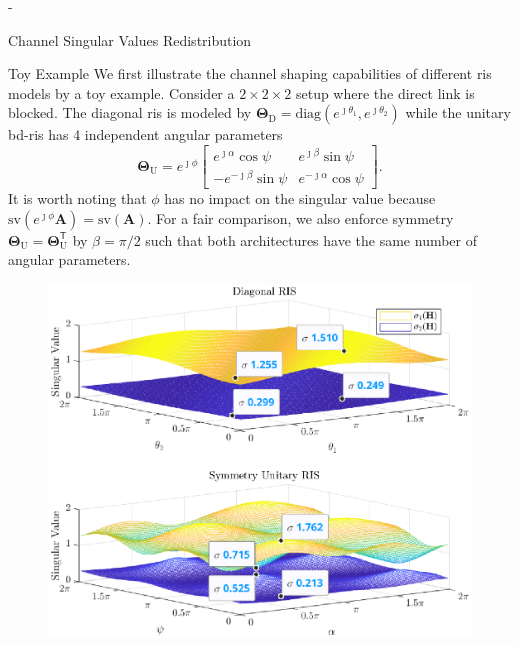 \begin{section}{-}
	\begin{subsection}{Channel Singular Values Redistribution}
		\begin{subsubsection}{Toy Example}\label{sc:toy_example}
			We first illustrate the channel shaping capabilities of different \gls{ris} models by a toy example.
			Consider a $2 \times 2 \times 2$ setup where the direct link is blocked.
			The diagonal \gls{ris} is modeled by $\mathbf{\Theta}_\mathrm{D} = \mathrm{diag}(e^{\jmath \theta_1}, e^{\jmath \theta_2})$ while the unitary \gls{bd}-\gls{ris} has 4 independent angular parameters
			\begin{equation}
				\mathbf{\Theta}_\mathrm{U} = e^{\jmath \phi} \begin{bmatrix}
					e^{\jmath \alpha} \cos \psi  & e^{\jmath \beta} \sin \psi   \\
					-e^{-\jmath \beta} \sin \psi & e^{-\jmath \alpha} \cos \psi
				\end{bmatrix}.
				\label{eq:unitary_ris}
			\end{equation}
			It is worth noting that $\phi$ has no impact on the singular value because $\mathrm{sv}(e^{\jmath \phi} \mathbf{A}) = \mathrm{sv}(\mathbf{A})$.
			For a fair comparison, we also enforce symmetry $\mathbf{\Theta}_\mathrm{U} = \mathbf{\Theta}_\mathrm{U}^\mathsf{T}$ by $\beta = \pi / 2$ such that both architectures have the same number of angular parameters.
			\begin{figure}
				\centering
				\includegraphics[width=\columnwidth]{assets/chapter_5/singular_trend.eps}

\end{figure}
\end{subsubsection}
\end{subsection}
\end{section}
